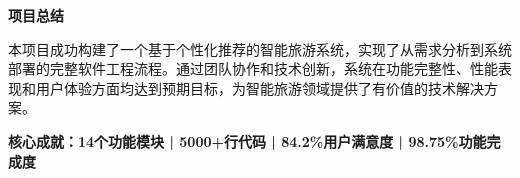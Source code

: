 \documentclass[12pt,a4paper]{article}
\begin{document}
\vfill

\begin{center}
\begin{tcolorbox}[
    colback=primary,
    coltext=white,
    halign=center,
    rounded corners=10pt,
    drop shadow,
    width=0.95\textwidth
]
\textbf{\LARGE 项目总结}\\[0.5cm]

\begin{minipage}{0.9\textwidth}
\centering
本项目成功构建了一个基于个性化推荐的智能旅游系统，实现了从需求分析到系统部署的完整软件工程流程。通过团队协作和技术创新，系统在功能完整性、性能表现和用户体验方面均达到预期目标，为智能旅游领域提供了有价值的技术解决方案。

\vspace{0.3cm}

\textcolor{accent}{\textbf{核心成就：14个功能模块 | 5000+行代码 | 84.2\%用户满意度 | 98.75\%功能完成度}}
\end{minipage}
\end{tcolorbox}
\end{center}
\end{document}
